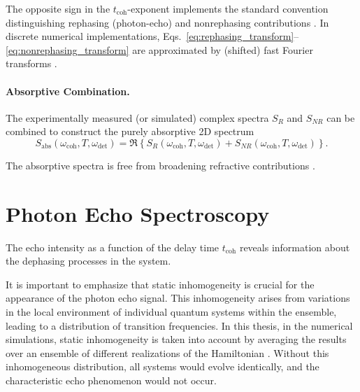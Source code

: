 \noindent 
The opposite sign in the $t_{\text{coh}}$-exponent implements the standard convention distinguishing rephasing (photon-echo) and nonrephasing contributions \cite{cho2009twodimensionalopticalspectroscopy, greenetal2024vibrationalcoherenceshalfbroadband}. In discrete numerical implementations, Eqs.~\eqref{eq:rephasing_transform}--\eqref{eq:nonrephasing_transform} are approximated by (shifted) fast Fourier transforms \cite{cho2009twodimensionalopticalspectroscopy, greenetal2024vibrationalcoherenceshalfbroadband}.

\paragraph{Absorptive Combination.}

\noindent 
The experimentally measured (or simulated) complex spectra $S_{R}$ and $S_{NR}$ can be combined to  construct the purely absorptive 2D spectrum \cite{mukamel1995principlesnonlinearoptical, jonas2003twodimensionalfemtosecondspectroscopy, greenetal2024vibrationalcoherenceshalfbroadband}
\begin{equation}
	S_{\text{abs}}(\omega_{\text{coh}}, T, \omega_{\text{det}})
	=
	\Re \left\{
	S_{R}(\omega_{\text{coh}}, T, \omega_{\text{det}}) + S_{NR}(\omega_{\text{coh}}, T, \omega_{\text{det}})
	\right\}.
	\label{eq:absorptive_spectrum}
\end{equation}

\noindent 
The absorptive spectra is free from broadening refractive contributions \cite{fullerogilvie2015experimentalimplementationstwodimensional}.



\section{Photon Echo Spectroscopy}
\label{sec:photon_echo}
\noindent 
The echo intensity as a function of the delay time $t_{\text{coh}}$ reveals information about the dephasing processes in the system.

\noindent 
It is important to emphasize that static inhomogeneity is crucial for the appearance of the photon echo signal. This inhomogeneity arises from variations in the local environment of individual quantum systems within the ensemble, leading to a distribution of transition frequencies. In this thesis, in the numerical simulations, static inhomogeneity is taken into account by averaging the results over an ensemble of different realizations of the Hamiltonian \cite{cho2009twodimensionalopticalspectroscopy, mukamel1995principlesnonlinearoptical}. Without this inhomogeneous distribution, all systems would evolve identically, and the characteristic echo phenomenon would not occur.

